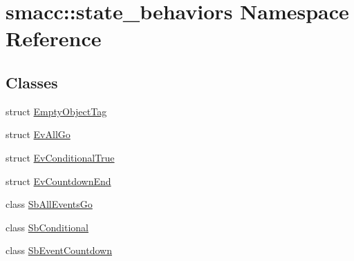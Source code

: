 \hypertarget{namespacesmacc_1_1state__behaviors}{}\section{smacc\+:\+:state\+\_\+behaviors Namespace Reference}
\label{namespacesmacc_1_1state__behaviors}
\subsection*{Classes}
\begin{DoxyCompactItemize}
\item 
struct \hyperlink{structsmacc_1_1state__behaviors_1_1EmptyObjectTag}{Empty\+Object\+Tag}
\item 
struct \hyperlink{structsmacc_1_1state__behaviors_1_1EvAllGo}{Ev\+All\+Go}
\item 
struct \hyperlink{structsmacc_1_1state__behaviors_1_1EvConditionalTrue}{Ev\+Conditional\+True}
\item 
struct \hyperlink{structsmacc_1_1state__behaviors_1_1EvCountdownEnd}{Ev\+Countdown\+End}
\item 
class \hyperlink{classsmacc_1_1state__behaviors_1_1SbAllEventsGo}{Sb\+All\+Events\+Go}
\item 
class \hyperlink{classsmacc_1_1state__behaviors_1_1SbConditional}{Sb\+Conditional}
\item 
class \hyperlink{classsmacc_1_1state__behaviors_1_1SbEventCountdown}{Sb\+Event\+Countdown}
\end{DoxyCompactItemize}

